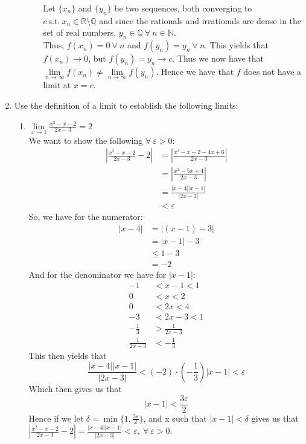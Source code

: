 \documentclass[12pt,letterpaper]{article}
\newcommand{\st}{\ \text{s.t.}\ }
\newcommand{\abs}[1]{\left\lvert #1 \right\rvert}
\newcommand{\R}{\mathbb{R}}
\newcommand{\N}{\mathbb{N}}
\newcommand{\Q}{\mathbb{Q}}
\theoremstyle{case}
\theoremstyle{definition}
\begin{document}
\begin{enumerate}
\begin{enumerate}
\begin{enumerate}
				Let $\{x_n\}$ and $\{y_n\}$ be two sequences, both converging to $c \st x_n \in \R \setminus \Q$ and since the rationals and irrationals are dense in the set of real numbers, $y_n \in \Q\ \forall\ n \in \N$.\\
				
				Thus, $f(x_n)=0\ \forall\ n$ and $f(y_n)=y_n\ \forall\ n$. This yields that $f(x_n) \to 0$, but $f(y_n)=y_n \to c$. Thus we now have that $\lim\limits_{n \to \infty} f(x_n) \neq \lim\limits_{n \to \infty} f(y_n)$. Hence we have that $f$ does not have a limit at $x=c$.
			\end{enumerate}
		\end{enumerate}
	\item Use the definition of a limit to establish the following limits:
		\begin{enumerate}
			\item $\lim\limits_{x \to 1} \frac{x^2-x-2}{2x-3}=2$\\
			
			We want to show the following $\forall\ \varepsilon > 0$:
			\begin{align*}
				\abs{\frac{x^2-x-2}{2x-3}-2} &= \abs{\frac{x^2-x-2-4x+6}{2x-3}} \\
				&= \abs{\frac{x^2-5x+4}{2x-3}} \\
				&= \frac{|x-4||x-1|}{|2x-3|} \\
				&<\varepsilon
			\end{align*}
			So, we have for the numerator:
			\begin{align*}
				|x-4| &= |(x-1)-3| \\
				&= |x-1|-3 \\
				&\leq 1-3 \\
				&= -2
			\end{align*}
			And for the denominator we have for $|x-1|$:
			\begin{align*}
				-1 &< x-1 < 1 \\
				0 &< x < 2 \\
				0 &< 2x < 4 \\
				-3 &< 2x-3 < 1 \\
				-\frac{1}{3} &> \frac{1}{2x-3} \\
				\frac{1}{2x-3} &< -\frac{1}{3}
			\end{align*}
			This then yields that
				\[\frac{|x-4||x-1|}{|2x-3|}<(-2)\cdot\left(-\frac{1}{3}\right)|x-1|<\varepsilon\]
			Which then gives us that 
			\[|x-1|<\frac{3\varepsilon}{2}\]
			Hence if we let $\delta = \min \{1, \frac{3\varepsilon}{2}\}$, and x such that $|x-1|<\delta$ gives us that $\abs{\frac{x^2-x-2}{2x-3}-2}=\frac{|x-4||x-1|}{|2x-3|}< \varepsilon,\ \forall\ \varepsilon>0$.\\
			

\end{enumerate}
\end{enumerate}
\end{document}
